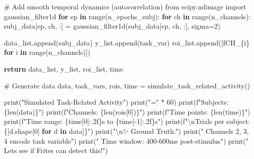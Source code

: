 \documentclass[
  11pt,
  letterpaper,
  oneside,
  openany]{book}
\newenvironment{Shaded}{\begin{snugshade}}{\end{snugshade}}
\newcommand{\BuiltInTok}[1]{\textcolor[rgb]{0.00,0.23,0.31}{#1}}
\newcommand{\CharTok}[1]{\textcolor[rgb]{0.13,0.47,0.30}{#1}}
\newcommand{\CommentTok}[1]{\textcolor[rgb]{0.37,0.37,0.37}{#1}}
\newcommand{\ControlFlowTok}[1]{\textcolor[rgb]{0.00,0.23,0.31}{\textbf{#1}}}
\newcommand{\DecValTok}[1]{\textcolor[rgb]{0.68,0.00,0.00}{#1}}
\newcommand{\ImportTok}[1]{\textcolor[rgb]{0.00,0.46,0.62}{#1}}
\newcommand{\KeywordTok}[1]{\textcolor[rgb]{0.00,0.23,0.31}{\textbf{#1}}}
\newcommand{\NormalTok}[1]{\textcolor[rgb]{0.00,0.23,0.31}{#1}}
\newcommand{\OperatorTok}[1]{\textcolor[rgb]{0.37,0.37,0.37}{#1}}
\newcommand{\SpecialCharTok}[1]{\textcolor[rgb]{0.37,0.37,0.37}{#1}}
\newcommand{\SpecialStringTok}[1]{\textcolor[rgb]{0.13,0.47,0.30}{#1}}
\newcommand{\StringTok}[1]{\textcolor[rgb]{0.13,0.47,0.30}{#1}}
\begin{document}
\begin{Shaded}
\begin{Highlighting}[]
        \CommentTok{\# Add smooth temporal dynamics (autocorrelation)}
        \ImportTok{from}\NormalTok{ scipy.ndimage }\ImportTok{import}\NormalTok{ gaussian\_filter1d}
        \ControlFlowTok{for}\NormalTok{ ep }\KeywordTok{in} \BuiltInTok{range}\NormalTok{(n\_epochs\_subj):}
            \ControlFlowTok{for}\NormalTok{ ch }\KeywordTok{in} \BuiltInTok{range}\NormalTok{(n\_channels):}
\NormalTok{                subj\_data[ep, ch, :] }\OperatorTok{=}\NormalTok{ gaussian\_filter1d(subj\_data[ep, ch, :], sigma}\OperatorTok{=}\DecValTok{2}\NormalTok{)}
        
\NormalTok{        data\_list.append(subj\_data)}
\NormalTok{        y\_list.append(task\_var)}
\NormalTok{        roi\_list.append([}\SpecialStringTok{f\textquotesingle{}CH\_}\SpecialCharTok{\{}\NormalTok{i}\SpecialCharTok{\}}\SpecialStringTok{\textquotesingle{}} \ControlFlowTok{for}\NormalTok{ i }\KeywordTok{in} \BuiltInTok{range}\NormalTok{(n\_channels)])}
    
    \ControlFlowTok{return}\NormalTok{ data\_list, y\_list, roi\_list, time}

\CommentTok{\# Generate data}
\NormalTok{data, task\_vars, rois, time }\OperatorTok{=}\NormalTok{ simulate\_task\_related\_activity()}

\BuiltInTok{print}\NormalTok{(}\StringTok{"Simulated Task{-}Related Activity"}\NormalTok{)}
\BuiltInTok{print}\NormalTok{(}\StringTok{"="} \OperatorTok{*} \DecValTok{60}\NormalTok{)}
\BuiltInTok{print}\NormalTok{(}\SpecialStringTok{f"Subjects: }\SpecialCharTok{\{}\BuiltInTok{len}\NormalTok{(data)}\SpecialCharTok{\}}\SpecialStringTok{"}\NormalTok{)}
\BuiltInTok{print}\NormalTok{(}\SpecialStringTok{f"Channels: }\SpecialCharTok{\{}\BuiltInTok{len}\NormalTok{(rois[}\DecValTok{0}\NormalTok{])}\SpecialCharTok{\}}\SpecialStringTok{"}\NormalTok{)}
\BuiltInTok{print}\NormalTok{(}\SpecialStringTok{f"Time points: }\SpecialCharTok{\{}\BuiltInTok{len}\NormalTok{(time)}\SpecialCharTok{\}}\SpecialStringTok{"}\NormalTok{)}
\BuiltInTok{print}\NormalTok{(}\SpecialStringTok{f"Time range: }\SpecialCharTok{\{}\NormalTok{time[}\DecValTok{0}\NormalTok{]}\SpecialCharTok{:.2f\}}\SpecialStringTok{s to }\SpecialCharTok{\{}\NormalTok{time[}\OperatorTok{{-}}\DecValTok{1}\NormalTok{]}\SpecialCharTok{:.2f\}}\SpecialStringTok{s"}\NormalTok{)}
\BuiltInTok{print}\NormalTok{(}\SpecialStringTok{f"}\CharTok{\textbackslash{}n}\SpecialStringTok{Trials per subject: }\SpecialCharTok{\{}\NormalTok{[d.shape[}\DecValTok{0}\NormalTok{] }\ControlFlowTok{for}\NormalTok{ d }\KeywordTok{in}\NormalTok{ data]}\SpecialCharTok{\}}\SpecialStringTok{"}\NormalTok{)}
\BuiltInTok{print}\NormalTok{(}\StringTok{"}\CharTok{\textbackslash{}n}\StringTok{✨ Ground Truth:"}\NormalTok{)}
\BuiltInTok{print}\NormalTok{(}\StringTok{"   Channels 2, 3, 4 encode task variable"}\NormalTok{)}
\BuiltInTok{print}\NormalTok{(}\StringTok{"   Time window: 400{-}600ms post{-}stimulus"}\NormalTok{)}
\BuiltInTok{print}\NormalTok{(}\StringTok{"   Let\textquotesingle{}s see if Frites can detect this!"}\NormalTok{)}


\end{Highlighting}
\end{Shaded}
\end{document}

